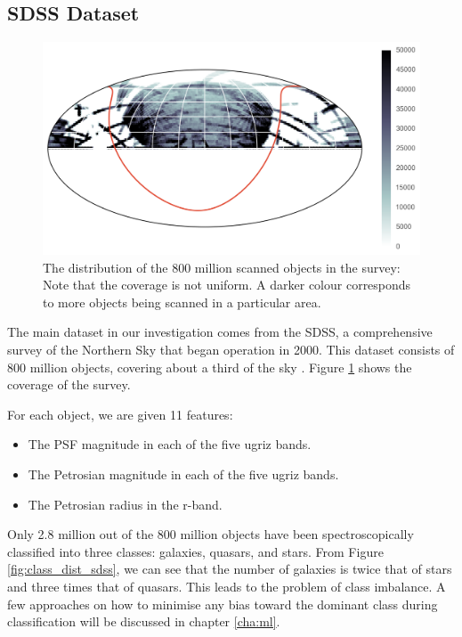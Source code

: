 \subsection{SDSS Dataset}
\begin{figure}[tbp]
	\centering
	\includegraphics[width=\textwidth]{figures/map_prediction_forest_all}
	\caption[The coverage of the SDSS]{The distribution of the 800 million scanned objects
		in the survey: Note that the coverage is not uniform. A darker colour
		corresponds to more objects being scanned in a particular area.}
	\label{fig:coverage}
\end{figure}

The main dataset in our investigation comes from the SDSS, a comprehensive survey of the
Northern Sky that began operation in 2000. This dataset consists of 800 million objects, covering
about a third of the sky \cite{alam15}. Figure \ref{fig:coverage} shows the coverage of the survey.

For each object, we are given 11 features:
	\begin{itemize}
		\item The PSF magnitude in each of the five ugriz bands.
		\item The Petrosian magnitude in each of the five ugriz bands.
		\item The Petrosian radius in the r-band.
	\end{itemize}
Only 2.8 million out of the 800 million objects have been spectroscopically classified into three
classes: galaxies, quasars, and stars. From Figure \ref{fig:class_dist_sdss}, we can see that the
number of galaxies is twice that of stars and three times that of quasars. This leads to
the problem of class imbalance. A few approaches on how to minimise any bias toward
the dominant class during classification will be discussed in chapter \ref{cha:ml}.

